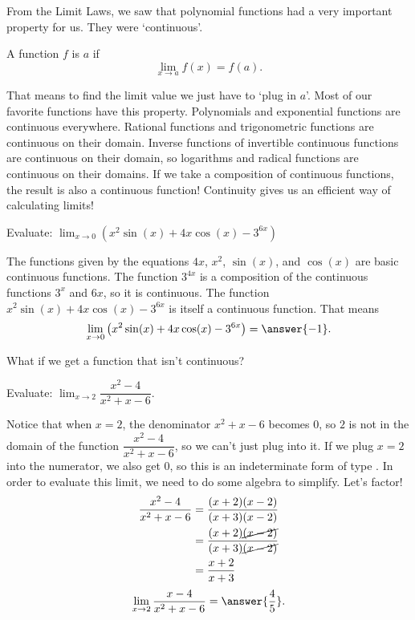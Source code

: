 \documentclass{ximera}
\begin{document}
From the Limit Laws, we saw that polynomial functions had a very important property for us.  They were `continuous'.
\begin{definition}
  A function $f$ is  $a$ if
  \[
  \lim_{x\to a}f(x) = f(a).
  \]
\end{definition}
That means to find the limit value we just have to `plug in $a$'.  Most of our favorite functions have this property.  Polynomials and exponential functions are continuous everywhere.
Rational functions and trigonometric functions are continuous on their domain.  Inverse functions of invertible continuous functions are continuous on their domain, so logarithms and
radical functions are continuous on their domains.  If we take a composition of continuous functions, the result is also a continuous function!  Continuity gives us an efficient way of calculating
limits!

\begin{example}
	Evaluate: $\displaystyle \lim_{x\to 0} \left(x^2 \sin(x) + 4x\cos(x) - 3^{6x} \right)$
	\begin{explanation}
		The functions given by the equations $4x$, $x^2$, $\sin(x)$, and $\cos(x)$ are basic continuous functions.  The function $3^{4x}$ is a composition
		of the continuous functions $3^x$ and $6x$, so it is continuous.  The function $x^2 \sin(x) + 4x\cos(x) - 3^{6x}$ is itself a continuous function.  That means
		\[ \lim_{x\to 0} \left( x^2 \sin(x) + 4x \cos(x) - 3^{6x} \right) = \answer{-1}. \]
	\end{explanation}
\end{example}

What if we get a function that isn't continuous?  
\begin{example}
	Evaluate: $\displaystyle \lim_{x\to 2} \dfrac{x^2-4}{x^2+x-6}$.
	\begin{explanation}
		Notice that when $x = 2$, the denominator $x^2+x-6$ becomes $0$, so $2$ is not in the domain of the function $\dfrac{x^2-4}{x^2+x-6}$, so we can't just plug into it.
		If we plug $x=2$ into the numerator, we also get $0$, so this is an indeterminate form of type \zeroOverZero.  In order to evaluate this limit, we need to do some algebra to simplify.
		Let's factor!
		\begin{align*}
			\dfrac{x^2-4}{x^2+x-6} &= \dfrac{(x+2)(x-2)}{(x+3)(x-2)}\\
				&= \dfrac{(x+2)\cancel{(x-2)}}{(x+3)\cancel{(x-2)}}\\
				&= \dfrac{x+2}{x+3}
		\end{align*}
		\[ \lim_{x\to 2} \dfrac{x-4}{x^2+x-6} = \answer{\frac{4}{5}}. \]	
	\end{explanation}
\end{example}
\end{document}
